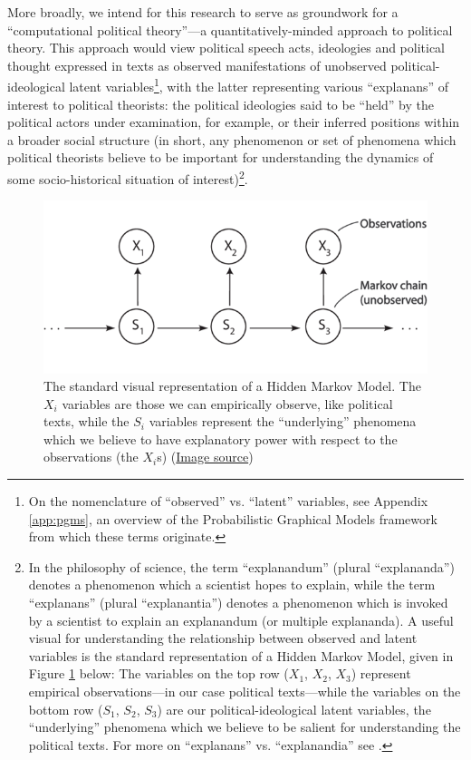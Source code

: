 More broadly, we intend for this research to serve as groundwork for a ``computational political theory''---a quantitatively-minded approach to political theory. This approach would view political speech acts, ideologies and political thought expressed in texts as observed manifestations of unobserved political-ideological latent variables\footnote{On the nomenclature of ``observed'' vs. ``latent'' variables, see Appendix \ref{app:pgms}, an overview of the Probabilistic Graphical Models framework from which these terms originate.}, with the latter representing various ``explanans'' of interest to political theorists: the political ideologies said to be ``held'' by the political actors under examination, for example, or their inferred positions within a broader social structure (in short, any phenomenon or set of phenomena which political theorists believe to be important for understanding the dynamics of some socio-historical situation of interest)\footnote{In the philosophy of science, the term ``explanandum'' (plural ``explananda'') denotes a phenomenon which a scientist hopes to explain, while the term ``explanans'' (plural ``explanantia'') denotes a phenomenon which is invoked by a scientist to explain an explanandum (or multiple explananda). A useful visual for understanding the relationship between observed and latent variables is the standard representation of a Hidden Markov Model, given in Figure \ref{fig:hmm} below: The variables on the top row ($X_1$, $X_2$, $X_3$) represent empirical observations—in our case political texts—while the variables on the bottom row ($S_1$, $S_2$, $S_3$) are our political-ideological latent variables, the ``underlying'' phenomena which we believe to be salient for understanding the political texts. For more on ``explanans'' vs. ``explanandia'' see \cite{elster_explaining_2015}.}.

\begin{figure}
    \centering
    \includegraphics[width=\textwidth]{ch1_figs/markov_chain.png}
    \caption{The standard visual representation of a Hidden Markov Model. The $X_i$ variables are those we can empirically observe, like political texts, while the $S_i$ variables represent the ``underlying'' phenomena which we believe to have explanatory power with respect to the observations (the $X_i$s) (\href{https://www.researchgate.net/figure/Basic-structure-of-a-Hidden-Markov-Model_fig2_24115579}{Image source})}
    \label{fig:hmm}
\end{figure}


